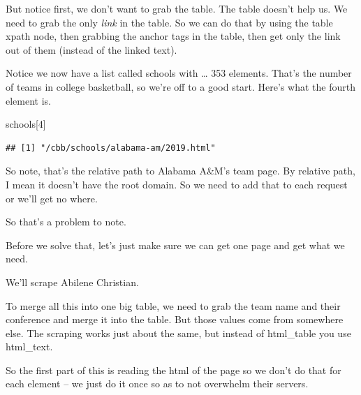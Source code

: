 \documentclass[
]{book}
\newenvironment{Shaded}{\begin{snugshade}}{\end{snugshade}}
\newcommand{\DataTypeTok}[1]{\textcolor[rgb]{0.13,0.29,0.53}{#1}}
\newcommand{\DecValTok}[1]{\textcolor[rgb]{0.00,0.00,0.81}{#1}}
\newcommand{\KeywordTok}[1]{\textcolor[rgb]{0.13,0.29,0.53}{\textbf{#1}}}
\newcommand{\NormalTok}[1]{#1}
\newcommand{\OperatorTok}[1]{\textcolor[rgb]{0.81,0.36,0.00}{\textbf{#1}}}
\newcommand{\StringTok}[1]{\textcolor[rgb]{0.31,0.60,0.02}{#1}}
\begin{document}
But notice first, we don't want to grab the table. The table doesn't help us. We need to grab the only \emph{link} in the table. So we can do that by using the table xpath node, then grabbing the anchor tags in the table, then get only the link out of them (instead of the linked text).

\begin{Shaded}
\end{Shaded}

Notice we now have a list called schools with \ldots{} 353 elements. That's the number of teams in college basketball, so we're off to a good start. Here's what the fourth element is.

\begin{Shaded}
\begin{Highlighting}[]
\NormalTok{schools[}\DecValTok{4}\NormalTok{]}
\end{Highlighting}
\end{Shaded}

\begin{verbatim}
## [1] "/cbb/schools/alabama-am/2019.html"
\end{verbatim}

So note, that's the relative path to Alabama A\&M's team page. By relative path, I mean it doesn't have the root domain. So we need to add that to each request or we'll get no where.

So that's a problem to note.

Before we solve that, let's just make sure we can get one page and get what we need.

We'll scrape Abilene Christian.

To merge all this into one big table, we need to grab the team name and their conference and merge it into the table. But those values come from somewhere else. The scraping works just about the same, but instead of html\_table you use html\_text.

So the first part of this is reading the html of the page so we don't do that for each element -- we just do it once so as to not overwhelm their servers.
\end{document}
